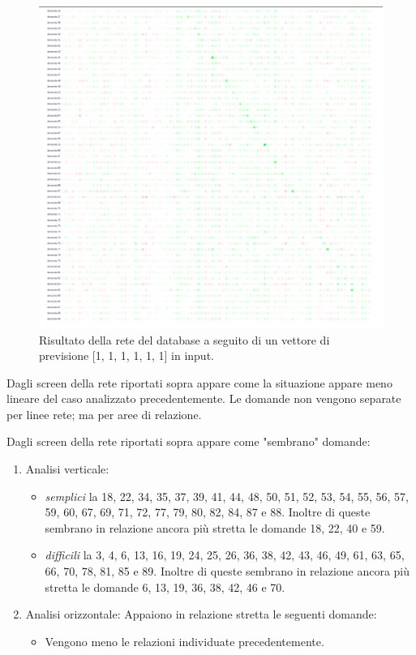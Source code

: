\begin{itemize}
\begin{figure}[H]
\centering
	\includegraphics[width=0.90\linewidth]{./image/rete_db-vp1_2architettura2.png}
	\caption{Risultato della rete del database a seguito di un vettore di previsione [1, 1, 1, 1, 1, 1] in input.}
\end{figure}

Dagli screen della rete riportati sopra appare come la situazione appare meno lineare del caso analizzato precedentemente. 
Le domande non vengono separate per linee rete; ma per aree di relazione.


Dagli screen della rete riportati sopra appare come "sembrano" domande:
\begin{enumerate}
\item Analisi verticale:
\begin{itemize}
\item \textit{semplici} la 18, 22, 34, 35, 37, 39, 41, 44, 48, 50, 51, 52, 53, 54, 55, 56, 57, 59, 60, 67, 69,  71, 72, 77, 79, 80, 82, 84, 87 e 88. Inoltre di queste sembrano in relazione ancora pi\`u stretta le domande 18, 22, 40 e 59.
\item \textit{difficili} la 3, 4, 6, 13, 16, 19, 24, 25, 26, 36, 38, 42, 43, 46, 49, 61, 63, 65, 66, 70, 78, 81, 85 e 89. Inoltre di queste sembrano in relazione ancora pi\`u stretta le domande 6, 13, 19, 36, 38, 42, 46 e 70.
\end{itemize}
\item Analisi orizzontale:
Appaiono in relazione stretta le seguenti domande:
\begin{itemize}
\item Vengono meno le relazioni individuate precedentemente.
\end{itemize}
\end{enumerate}
\noindent



\end{itemize}
